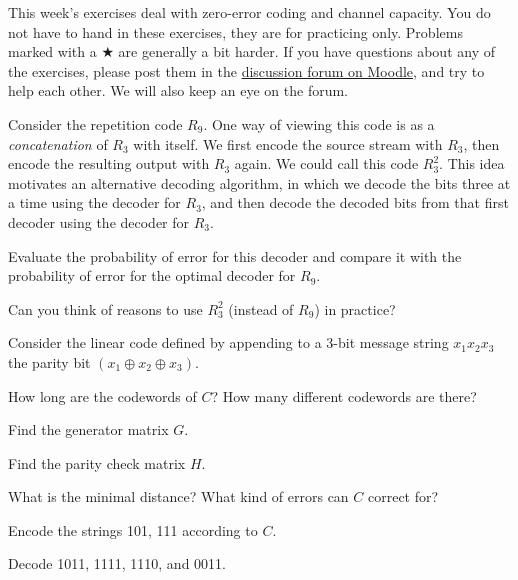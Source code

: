 \documentclass[a4paper,10pt,landscape,twocolumn]{scrartcl}
\begin{document}
\practiceproblems

{\sffamily\noindent
This week's exercises deal with zero-error coding and channel capacity. You do not have to hand in these exercises, they are for practicing only. Problems marked with a $\bigstar$ are generally a bit harder. If you have questions about any of the exercises, please post them in the \href{https://www.moodle.ch/lms/mod/forum/view.php?id=2219}{discussion forum on Moodle}, and try to help each other. We will also keep an eye on the forum.
}

\begin{exercise}
Consider the repetition code $R_9$. One way of viewing this code is as a \emph{concatenation} of $R_3$ with itself. We first encode the source stream with $R_3$, then encode the resulting output with $R_3$ again. We could call this code $R_3^2$. This idea motivates an alternative decoding algorithm, in which we decode the bits three at a time using the decoder for $R_3$, and then decode the decoded bits from that first decoder using the decoder for $R_3$.

Evaluate the probability of error for this decoder and compare it with the probability of error for the optimal decoder for $R_9$.

Can you think of reasons to use $R_3^2$ (instead of $R_9$) in practice?
\end{exercise}

\begin{exercise}
Consider the linear code defined by appending to a 3-bit message string $x_1x_2x_3$ the parity bit $(x_1 \oplus x_2 \oplus x_3)$.

\begin{subex}
How long are the codewords of $C$? How many different codewords are there?
\end{subex}

\begin{subex}
Find the generator matrix $G$.
\end{subex}

\begin{subex}
Find the parity check matrix $H$.
\end{subex}

\begin{subex}
What is the minimal distance? What kind of errors can $C$ correct for?
\end{subex}

\begin{subex}
Encode the strings 101, 111 according to $C$.
\end{subex}

\begin{subex}
Decode 1011, 1111, 1110, and 0011.
\end{subex}
\end{exercise}
\end{document}
